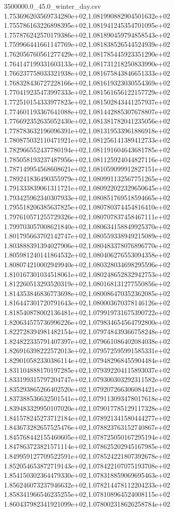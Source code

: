 \begin{filecontents*}{3500000.0_45.0_winter_day.csv}
1.753696203569734280e+02,1.081990882904501632e+02
1.755786163226898395e+02,1.081941245354701095e+02
1.757876242570179386e+02,1.081890459794858543e+02
1.759966441661147769e+02,1.081838526544524939e+02
1.762056760561277429e+02,1.081785445923351290e+02
1.764147199331603133e+02,1.081731218250833990e+02
1.766237758033321938e+02,1.081675843846651333e+02
1.768328436727228166e+02,1.081619323030554369e+02
1.770419235473997333e+02,1.081561656122157729e+02
1.772510154333977823e+02,1.081502843441257937e+02
1.774601193367641088e+02,1.081442885307678807e+02
1.776692352635052430e+02,1.081381782041235056e+02
1.778783632196096391e+02,1.081319533961886918e+02
1.780875032110471921e+02,1.081256141389412733e+02
1.782966552437780194e+02,1.081191604643681785e+02
1.785058193237487956e+02,1.081125924044827116e+02
1.787149954568608621e+02,1.081059099912827151e+02
1.789241836490355979e+02,1.080991132567751265e+02
1.791333839061311721e+02,1.080922022329650645e+02
1.793425962340307933e+02,1.080851769518594665e+02
1.795518206385637825e+02,1.080780374454816410e+02
1.797610571255729326e+02,1.080707837458467111e+02
1.799703057008621840e+02,1.080634158849925370e+02
1.801795663702142747e+02,1.080559338949215089e+02
1.803888391394027906e+02,1.080483378076896770e+02
1.805981240141864532e+02,1.080406276553094358e+02
1.808074210002949940e+02,1.080328034698295596e+02
1.810167301034518061e+02,1.080248652832942753e+02
1.812260513293520319e+02,1.080168131277550856e+02
1.814353846836773698e+02,1.080086470352362085e+02
1.816447301720791643e+02,1.080003670378146126e+02
1.818540878002136481e+02,1.079919731675390722e+02
1.820634575736996226e+02,1.079834654564792800e+02
1.822728394981482154e+02,1.079748439366758248e+02
1.824822335791407397e+02,1.079661086402084038e+02
1.826916398222572013e+02,1.079572595991585331e+02
1.829010582330386114e+02,1.079482968455904484e+02
1.831104888170197285e+02,1.079392204115893037e+02
1.833199315797204747e+02,1.079300303292311582e+02
1.835293865266402520e+02,1.079207266306084421e+02
1.837388536632501541e+02,1.079113093478017618e+02
1.839483329950107020e+02,1.079017785129117328e+02
1.841578245273712184e+02,1.078921341580444277e+02
1.843673282657525476e+02,1.078823763152740867e+02
1.845768442155460605e+02,1.078725050167295194e+02
1.847863723821571114e+02,1.078625202945167985e+02
1.849959127709522591e+02,1.078524221807392678e+02
1.852054653872719143e+02,1.078422107075193708e+02
1.854150302364479330e+02,1.078318859069695463e+02
1.856246073237946632e+02,1.078214478112204233e+02
1.858341966546235255e+02,1.078108964524008115e+02
1.860437982341921099e+02,1.078002318626258784e+02

\end{filecontents*}
